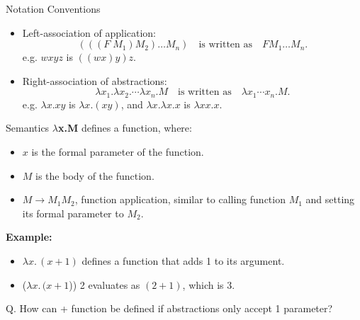 \documentclass{beamer}
\begin{document}


\begin{frame}{Notation Conventions}
  \begin{itemize}
    \item Left-association of application:
      \[
        (((F \; M_1)M_2)\ldots M_n) \quad\text{is written as}\quad F M_1 \ldots M_n.
      \]
      e.g. \(wxyz\) is \(((wx)y)z\).
    \item Right-association of abstractions:
      \[
        \lambda x_1.\lambda x_2.\cdots\lambda x_n.M \quad\text{is written as}\quad \lambda x_1 \cdots x_n.M.
      \]
      e.g. \(\lambda x.xy\) is \(\lambda x.(xy)\), and
      \(\lambda x.\lambda x.x\) is \(\lambda xx.x\).
  \end{itemize}
\end{frame}
\begin{frame}{Semantics}
  \textbf{$\lambda$x.M} defines a function, where:
  \begin{itemize}
    \item $x$ is the formal parameter of the function.
    \item $M$ is the body of the function.
    \item $M \to M_1 M_2$, function application, similar to calling function $M_1$ and setting its formal parameter to $M_2$.
  \end{itemize}
  \vspace{1em}
  \textbf{Example:}
  \begin{itemize}
    \item $\lambda x.\,(x+1)$ defines a function that adds 1 to its argument.
    \item ($\lambda x.\, (x+1$)) 2 evaluates as $(2+1)$, which is 3.
  \end{itemize}
  \begin{block}{}
    Q. How can + function be defined if abstractions only accept 1 parameter?\\
  \end{block}
\end{frame}
\end{document}
